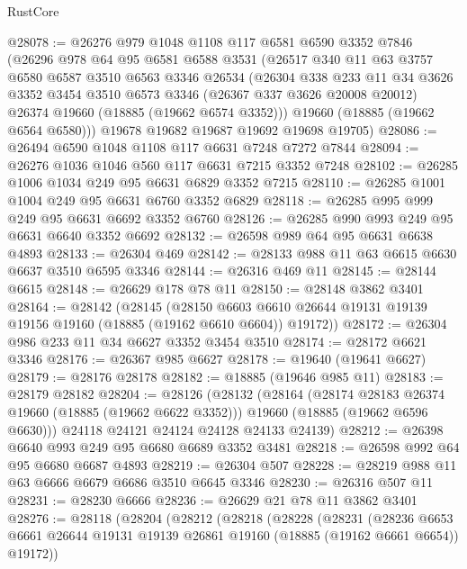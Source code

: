 \begin{lexlean}{RustCore}
\begin{coremodule}
@28078 := @26276
    @979
    @1048
    @1108
    @117
    @6581
    @6590
    @3352
    @7846
    (@26296
      @978
      @64
      @95
      @6581
      @6588
      @3531
      (@26517
        @340
        @11
        @63
        @3757
        @6580
        @6587
        @3510
        @6563
        @3346
        @26534
        (@26304
          @338
          @233
          @11
          @34
          @3626
          @3352
          @3454
          @3510
          @6573
          @3346
          (@26367 @337 @3626 @20008 @20012)
          @26374
          @19660
          (@18885 (@19662 @6574 @3352)))
        @19660
        (@18885 (@19662 @6564 @6580)))
      @19678
      @19682
      @19687
      @19692
      @19698
      @19705)
@28086 := @26494 @6590 @1048 @1108 @117 @6631 @7248 @7272 @7844
@28094 := @26276 @1036 @1046 @560 @117 @6631 @7215 @3352 @7248
@28102 := @26285 @1006 @1034 @249 @95 @6631 @6829 @3352 @7215
@28110 := @26285 @1001 @1004 @249 @95 @6631 @6760 @3352 @6829
@28118 := @26285 @995 @999 @249 @95 @6631 @6692 @3352 @6760
@28126 := @26285 @990 @993 @249 @95 @6631 @6640 @3352 @6692
@28132 := @26598 @989 @64 @95 @6631 @6638 @4893
@28133 := @26304 @469
@28142 := @28133 @988 @11 @63 @6615 @6630 @6637 @3510 @6595 @3346
@28144 := @26316 @469 @11
@28145 := @28144 @6615
@28148 := @26629 @178 @78 @11
@28150 := @28148 @3862 @3401
@28164 := @28142
    (@28145
      (@28150 @6603 @6610 @26644 @19131 @19139 @19156 @19160 (@18885 (@19162 @6610 @6604)) @19172))
@28172 := @26304 @986 @233 @11 @34 @6627 @3352 @3454 @3510
@28174 := @28172 @6621 @3346
@28176 := @26367 @985 @6627
@28178 := @19640 (@19641 @6627)
@28179 := @28176 @28178
@28182 := @18885 (@19646 @985 @11)
@28183 := @28179 @28182
@28204 := @28126
    (@28132
      (@28164
        (@28174 @28183 @26374 @19660 (@18885 (@19662 @6622 @3352)))
        @19660
        (@18885 (@19662 @6596 @6630)))
      @24118
      @24121
      @24124
      @24128
      @24133
      @24139)
@28212 := @26398 @6640 @993 @249 @95 @6680 @6689 @3352 @3481
@28218 := @26598 @992 @64 @95 @6680 @6687 @4893
@28219 := @26304 @507
@28228 := @28219 @988 @11 @63 @6666 @6679 @6686 @3510 @6645 @3346
@28230 := @26316 @507 @11
@28231 := @28230 @6666
@28236 := @26629 @21 @78 @11 @3862 @3401
@28276 := @28118
    (@28204
      (@28212
        (@28218
          (@28228
            (@28231
              (@28236
                @6653
                @6661
                @26644
                @19131
                @19139
                @26861
                @19160
                (@18885 (@19162 @6661 @6654))
                @19172))

\end{coremodule}
\end{lexlean}
